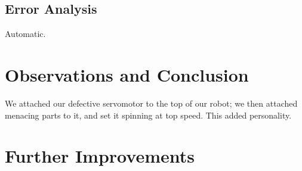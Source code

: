 \documentclass[twocolumn]{article}
\begin{document}
\subsection{Error Analysis}

Automatic.

\section{Observations and Conclusion}

We attached our defective servomotor to the top of our robot; we then attached menacing parts to it, and set it spinning at top speed. This added personality.

\section{Further Improvements}


\end{document}
